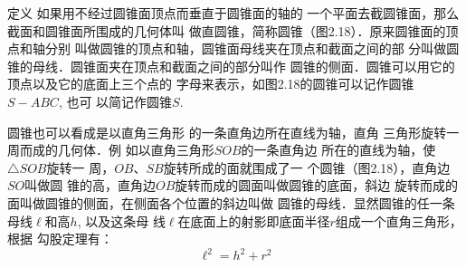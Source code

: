 \begin{figure}[htp]\centering
    \begin{minipage}[t]{0.48\textwidth}
    \centering
{}
    \caption{}
    \end{minipage}
    \begin{minipage}[t]{0.48\textwidth}
    \centering
{}
    \caption{}
    \end{minipage}
    \end{figure}

\begin{blk}
    {定义} 如果用不经过圆锥面顶点而垂直于圆锥面的轴的
一个平面去截圆锥面，那么截面和圆锥面所围成的几何体叫
做直圆锥，简称圆锥（图2.18）．原来圆锥面的顶点和轴分别
叫做圆锥的顶点和轴，圆锥面母线夹在顶点和截面之间的部
分叫做圆锥的母线．圆锥面夹在顶点和截面之间的部分叫作
圆锥的侧面．圆锥可以用它的顶点以及它的底面上三个点的
字母来表示，如图2.18的圆锥可以记作圆锥$S-ABC$, 也可
以简记作圆锥$S$.
\end{blk}

圆锥也可以看成是以直角三角形
的一条直角边所在直线为轴，直角
三角形旋转一周而成的几何体．例
如以直角三角形$SOB$的一条直角边
所在的直线为轴，使$\triangle SOB$旋转一
周，$OB$、$SB$旋转所成的面就围成了一
个圆锥（图2.18），直角边$SO$叫做圆
锥的高，直角边$OB$旋转而成的圆面叫做圆锥的底面，斜边
旋转而成的面叫做圆锥的侧面，在侧面各个位置的斜边叫做
圆锥的母线．显然圆锥的任一条母线$\ell$和高$h$, 以及这条母
线$\ell$在底面上的射影即底面半径$r$组成一个直角三角形，根据
勾股定理有：
\[\ell^2=h^2+r^2\]

